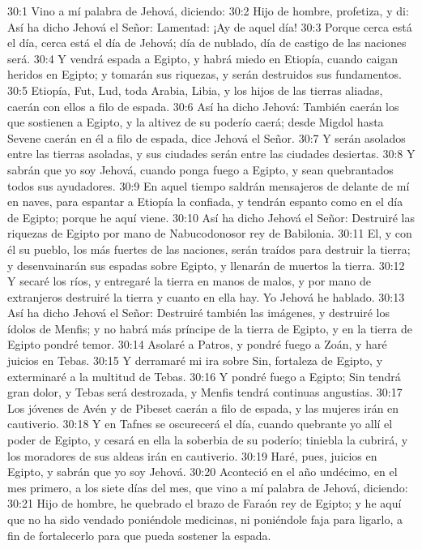 30:1 Vino a mí palabra de Jehová, diciendo:   
30:2 Hijo de hombre, profetiza, y di: Así ha dicho Jehová el Señor: Lamentad: ¡Ay de aquel día!   
30:3 Porque cerca está el día, cerca está el día de Jehová; día de nublado, día de castigo de las naciones será.   
30:4 Y vendrá espada a Egipto, y habrá miedo en Etiopía, cuando caigan heridos en Egipto; y tomarán sus riquezas, y serán destruidos sus fundamentos.   
30:5 Etiopía, Fut, Lud, toda Arabia, Libia, y los hijos de las tierras aliadas, caerán con ellos a filo de espada.   
30:6 Así ha dicho Jehová: También caerán los que sostienen a Egipto, y la altivez de su poderío caerá; desde Migdol hasta Sevene caerán en él a filo de espada, dice Jehová el Señor.   
30:7 Y serán asolados entre las tierras asoladas, y sus ciudades serán entre las ciudades desiertas.   
30:8 Y sabrán que yo soy Jehová, cuando ponga fuego a Egipto, y sean quebrantados todos sus ayudadores.   
30:9 En aquel tiempo saldrán mensajeros de delante de mí en naves, para espantar a Etiopía la confiada, y tendrán espanto como en el día de Egipto; porque he aquí viene.   
30:10 Así ha dicho Jehová el Señor: Destruiré las riquezas de Egipto por mano de Nabucodonosor rey de Babilonia.   
30:11 El, y con él su pueblo, los más fuertes de las naciones, serán traídos para destruir la tierra; y desenvainarán sus espadas sobre Egipto, y llenarán de muertos la tierra.   
30:12 Y secaré los ríos, y entregaré la tierra en manos de malos, y por mano de extranjeros destruiré la tierra y cuanto en ella hay. Yo Jehová he hablado.   
30:13 Así ha dicho Jehová el Señor: Destruiré también las imágenes, y destruiré los ídolos de Menfis; y no habrá más príncipe de la tierra de Egipto, y en la tierra de Egipto pondré temor.   
30:14 Asolaré a Patros, y pondré fuego a Zoán, y haré juicios en Tebas.   
30:15 Y derramaré mi ira sobre Sin, fortaleza de Egipto, y exterminaré a la multitud de Tebas.   
30:16 Y pondré fuego a Egipto; Sin tendrá gran dolor, y Tebas será destrozada, y Menfis tendrá continuas angustias.   
30:17 Los jóvenes de Avén y de Pibeset caerán a filo de espada, y las mujeres irán en cautiverio.   
30:18 Y en Tafnes se oscurecerá el día, cuando quebrante yo allí el poder de Egipto, y cesará en ella la soberbia de su poderío; tiniebla la cubrirá, y los moradores de sus aldeas irán en cautiverio.   
30:19 Haré, pues, juicios en Egipto, y sabrán que yo soy Jehová.   
30:20 Aconteció en el año undécimo, en el mes primero, a los siete días del mes, que vino a mí palabra de Jehová, diciendo:   
30:21 Hijo de hombre, he quebrado el brazo de Faraón rey de Egipto; y he aquí que no ha sido vendado poniéndole medicinas, ni poniéndole faja para ligarlo, a fin de fortalecerlo para que pueda sostener la espada.   
